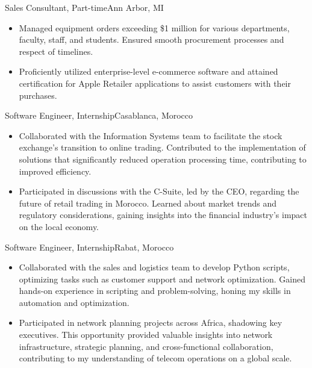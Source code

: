 \documentclass[letterpaper,10.5pt]{article}
\begin{document}
{Sales Consultant, Part-time}{Ann Arbor, MI}
\begin{itemize}
    \item Managed equipment orders exceeding \$1 million for various departments, faculty, staff, and students. Ensured smooth procurement processes and respect of timelines.
    
    \item Proficiently utilized enterprise-level e-commerce software and attained certification for Apple Retailer applications to assist customers with their purchases.
\end{itemize}

{Software Engineer, Internship}{Casablanca, Morocco}
\begin{itemize}
    \item Collaborated with the Information Systems team to facilitate the stock exchange’s transition to online trading. Contributed to the implementation of solutions that significantly reduced operation processing time, contributing to improved efficiency.
    
    \item Participated in discussions with the C-Suite, led by the CEO, regarding the future of retail trading in Morocco. Learned about market trends and regulatory considerations, gaining insights into the financial industry's impact on the local economy.
\end{itemize}
{Software Engineer, Internship}{Rabat, Morocco}
\begin{itemize}
    \item Collaborated with the sales and logistics team to develop Python scripts, optimizing tasks such as customer support and network optimization. Gained hands-on experience in scripting and problem-solving, honing my skills in automation and optimization.
    
    \item Participated in network planning projects across Africa, shadowing key executives. This opportunity provided valuable insights into network infrastructure, strategic planning, and cross-functional collaboration, contributing to my understanding of telecom operations on a global scale.

\end{itemize}
\end{document}
